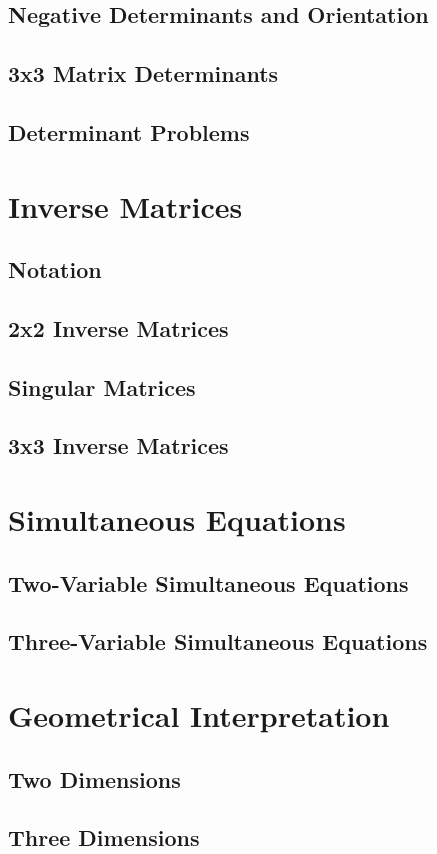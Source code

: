 \documentclass[../alevelmaths.tex]{subfiles}
\begin{document}
\subsection*{Negative Determinants and Orientation}
\subsection*{3x3 Matrix Determinants}
\subsection*{Determinant Problems}
\section{Inverse Matrices}
\subsection*{Notation}
\subsection*{2x2 Inverse Matrices}
\subsection*{Singular Matrices}
\subsection*{3x3 Inverse Matrices}
\section{Simultaneous Equations}
\subsection*{Two-Variable Simultaneous Equations}
\subsection*{Three-Variable Simultaneous Equations}
\section{Geometrical Interpretation}
\subsection*{Two Dimensions}
\subsection*{Three Dimensions}
\end{document}
